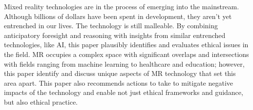 Mixed reality technologies are in the process of emerging into the mainstream. Although billions of dollars have been spent in development, they aren't yet entrenched in our lives. The technology is still malleable. By combining anticipatory foresight and reasoning with insights from similar entrenched technologies, like AI, this paper plausibly identifies and evaluates ethical issues in the field. MR occupies a complex space with significant overlaps and intersections with fields ranging from machine learning to healthcare and education; however, this paper identify and discuss unique aspects of MR technology that set this area apart. This paper also recommends actions to take to mitigate negative impacts of the technology and enable not just ethical frameworks and guidance, but also ethical practice.